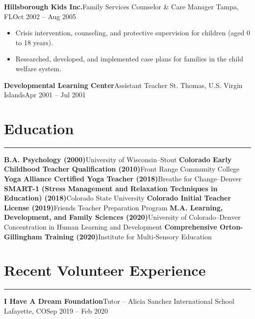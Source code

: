 \documentclass[letterpaper,10pt]{article}
\newcommand{\mblue}{\color{darkblue}}
\begin{document}
\vspace{1pc}
\textbf{Hillsborough Kids Inc.}\hfill Family Services Counselor \& Care Manager
\smallbreak Tampa, FL\hfill Oct 2002 -- Aug 2005

\begin{itemize}
    \item Crisis intervention, counseling, and protective supervision for children (aged 0 to 18 years).
    \item Researched, developed, and implemented case plans for families in the child welfare system.
\end{itemize}

\vspace{1pc}
\textbf{Developmental Learning Center}\hfill Assistant Teacher
\smallbreak St. Thomas, U.S. Virgin Islands\hfill Apr 2001 -- Jul 2001


\section*{\mblue Education}

\vspace{-2.15pc}
{\hfill\mblue\rule{5.845in}{0.02cm}}

\vspace{1pc}
\textbf{B.A. Psychology (2000)}\hfill University of Wisconsin--Stout
\bigbreak\textbf{Colorado Early Childhood Teacher Qualification (2010)}\hfill Front Range Community College
\bigbreak\textbf{Yoga Alliance Certified Yoga Teacher (2018)}\hfill Breathe for Change--Denver
\bigbreak\textbf{SMART-1 (Stress Management and Relaxation Techniques in Education) (2018)}\hfill Colorado State University
\bigbreak\textbf{Colorado Initial Teacher License (2019)}\hfill Friends Teacher Preparation Program
\bigbreak\textbf{M.A. Learning, Development, and Family Sciences (2020)}\hfill University of Colorado--Denver
\smallbreak Concentration in Human Learning and Development
\bigbreak\textbf{Comprehensive Orton-Gillingham Training (2020)}\hfill Institute for Multi-Sensory Education

\section*{\mblue Recent Volunteer Experience}

\vspace{-2.15pc}
{\hfill\mblue\rule{4.17in}{0.02cm}}

\vspace{1pc}
\textbf{I Have A Dream Foundation}\hfill Tutor -- Alicia Sanchez International School
\smallbreak Lafayette, CO\hfill Sep 2019 -- Feb 2020
\end{document}
